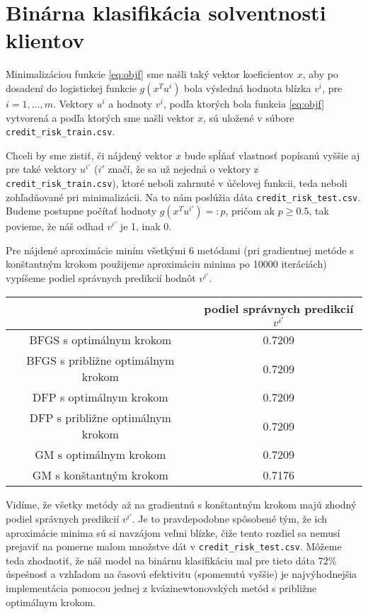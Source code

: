 \documentclass[report.tex]{subfiles}
\begin{document}
\section{Binárna klasifikácia solventnosti klientov}\label{sec:G}

Minimalizáciou funkcie \ref{eq:objf} sme našli taký vektor koeficientov $x$, aby po dosadení do logistickej funkcie $g(x^Tu^i)$ bola výsledná hodnota blízka $v^i$, pre $i=1,\dots,m$. Vektory $u^i$ a hodnoty $v^i$, podľa ktorých bola funkcia \ref{eq:objf} vytvorená a podľa ktorých sme našli vektor $x$, sú uložené v súbore \verb*|credit_risk_train.csv|.

Chceli by sme zistiť, či nájdený vektor $x$ bude spĺňať vlastnosť popísanú vyššie aj pre také vektory $u^{i'}$ ($i'$ značí, že sa už nejedná o vektory z \verb*|credit_risk_train.csv|), ktoré neboli zahrnuté v účelovej funkcii, teda neboli zohľadňované pri minimalizácii. Na to nám poslúžia dáta \verb*|credit_risk_test.csv|. Budeme postupne počítať hodnoty $g(x^Tu^{i'}) =: p$, pričom ak $p \geq 0.5$, tak povieme, že náš odhad $v^{i'}$ je 1, inak 0.

Pre nájdené aproximácie miním všetkými 6 metódami (pri gradientnej metóde s konštantným krokom použijeme aproximáciu minima po 10000 iteráciách) vypíšeme podiel správnych predikcií hodnôt $v^{i'}$.

\begin{center}
	\small
	\begin{tabular}{| c | c |}
		\hline
		& podiel správnych predikcií $v^{i'}$  \\
		\hline
		BFGS s optimálnym krokom & 0.7209  \\
		BFGS s približne optimálnym krokom & 0.7209  \\
		DFP s optimálnym krokom & 0.7209  \\
		DFP s približne optimálnym krokom & 0.7209  \\
		GM s optimálnym krokom & 0.7209  \\
		GM s konštantným krokom & 0.7176  \\
		\hline
	\end{tabular}
\end{center}

Vidíme, že všetky metódy až na gradientnú s konštantným krokom majú zhodný podiel správnych predikcií $v^{i'}$. Je to pravdepodobne spôsobené tým, že ich aproximácie minima sú si navzájom veľmi blízke, čiže tento rozdiel sa nemusí prejaviť na pomerne malom množstve dát v \verb*|credit_risk_test.csv|. Môžeme teda zhodnotiť, že náš model na binárnu klasifikáciu mal pre tieto dáta 72\% úspešnosť a vzhľadom na časovú efektivitu (spomenutú vyššie) je najvýhodnejšia implementácia pomocou jednej z kvázinewtonovských metód s približne optimálnym krokom.
\end{document}
